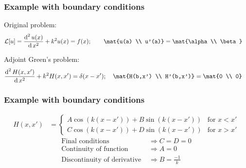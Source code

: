 \documentclass[12 pt, compress, handout, intlimits]{beamer}
\renewcommand{\d}{\operatorname{d}}
\renewcommand{\L}{\mathcal{L}}
\renewcommand{\L}{\mathcal{L}}
\begin{document}
\begin{frame}[fragile]
    \frametitle{Example with boundary conditions}

    Original problem:
    \begin{align*}
        \L[u] = \frac{\d^2 u(x)}{\d x^2} + k^2 u(x) &= f(x); \qquad \mat{u(a) \\ u'(a)} = \mat{\alpha \\ \beta}
    \end{align*}

    Adjoint Green's problem:
    \begin{align*}
        \frac{\d^2 H(x,x')}{\d x^2} + k^2 H(x,x') &= \delta(x - x'); \quad \mat{H(b,x') \\ H'(b,x')} = \mat{0 \\ 0}
    \end{align*}
    
\end{frame}


\begin{frame}[fragile]
    \frametitle{Example with boundary conditions}

    \begin{align*}
        H(x,x') &= 
            \begin{cases} 
                A \cos(k(x - x')) + B \sin(k(x - x')) & \text{for } x < x'
                \\
                C \cos(k(x - x')) + D \sin(k(x - x')) & \text{for } x > x'
            \end{cases}
    \end{align*}
    \begin{align*}
        \text{Final conditions } & \Longrightarrow C = D = 0
        \\
        \text{Continuity of function } & \Longrightarrow A = 0
        \\
        \text{Discontinuity of derivative } & \Longrightarrow B = \frac{-1}{k}
    \end{align*}
    
\end{frame}
\end{document}
